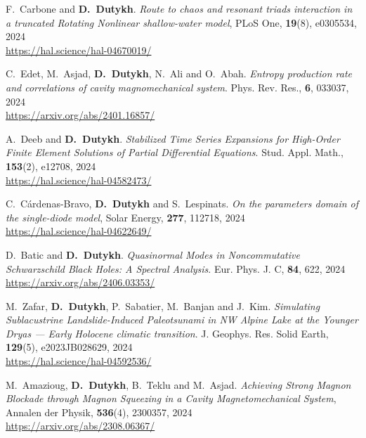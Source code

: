 \documentclass[final, a4paper, oneside, 12pt]{article}
\numberwithin{equation}{section}
\begin{document}
\begin{etaremune}
  \item F.~Carbone and \textbf{D.~Dutykh}. \textit{Route to chaos and resonant triads interaction in a truncated Rotating Nonlinear shallow-water model}, PLoS One, \textbf{19}(8), e0305534, 2024 \\ %
  \url{https://hal.science/hal-04670019/}

  \item C.~Edet, M.~Asjad, \textbf{D.~Dutykh}, N.~Ali and O.~Abah. \textit{Entropy production rate and correlations of cavity magnomechanical system}. Phys. Rev. Res., \textbf{6}, 033037, 2024 \\ %
  \url{https://arxiv.org/abs/2401.16857/}

  \item A.~Deeb and \textbf{D.~Dutykh}. \textit{Stabilized Time Series Expansions for High-Order Finite Element Solutions of Partial Differential Equations}. Stud. Appl. Math., \textbf{153}(2), e12708, 2024 \\ %
  \url{https://hal.science/hal-04582473/}
  
  \item C.~C\'ardenas-Bravo, \textbf{D.~Dutykh} and S.~Lespinats. \textit{On the parameters domain of the single-diode model}, Solar Energy, \textbf{277}, 112718, 2024 \\ %
  \url{https://hal.science/hal-04622649/}
  
  \item D.~Batic and \textbf{D.~Dutykh}. \textit{Quasinormal Modes in Noncommutative Schwarzschild Black Holes: A Spectral Analysis}. Eur. Phys. J. C, \textbf{84}, 622, 2024 \\ %
  \url{https://arxiv.org/abs/2406.03353/}

  \item M.~Zafar, \textbf{D.~Dutykh}, P.~Sabatier, M.~Banjan and J.~Kim. \textit{Simulating Sublacustrine Landslide-Induced Paleotsunami in NW Alpine Lake at the Younger Dryas --- Early Holocene climatic transition}. J. Geophys. Res. Solid Earth, \textbf{129}(5), e2023JB028629, 2024 \\ %
  \url{https://hal.science/hal-04592536/}
  
  \item M.~Amazioug, \textbf{D.~Dutykh}, B.~Teklu and M.~Asjad. \textit{Achieving Strong Magnon Blockade through Magnon Squeezing in a Cavity Magnetomechanical System}, Annalen der Physik, \textbf{536}(4), 2300357, 2024 \\ %
  \url{https://arxiv.org/abs/2308.06367/}
  

\end{etaremune}
\end{document}
